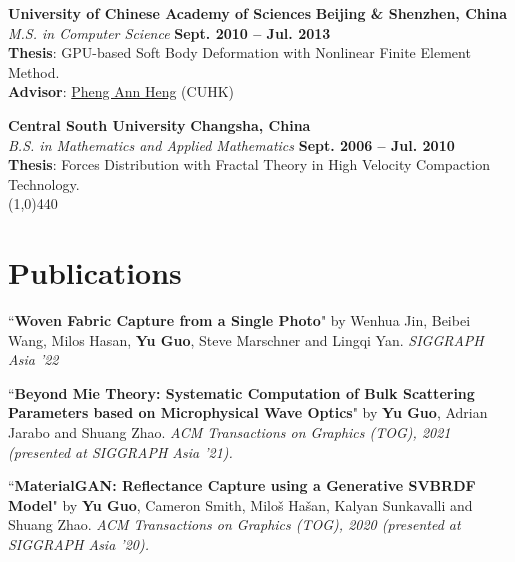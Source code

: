\documentclass[margin,line]{resume}
\begin{document}
\begin{resume}
    \textbf{University of Chinese Academy of Sciences}  \hfill \textbf{Beijing \& Shenzhen, China}\\
    \textsl{M.S. in Computer Science}                 \hfill \textbf{Sept. 2010 -- Jul. 2013} \\
	\textbf{Thesis}: GPU-based Soft Body Deformation with Nonlinear Finite Element Method. \\
	\textbf{Advisor}: \href{http://www.cse.cuhk.edu.hk/~pheng/}{Pheng Ann Heng} (CUHK)

    \textbf{Central South University}      \hfill \textbf{Changsha, China} \\
    \textsl{B.S. in Mathematics and Applied Mathematics}                \hfill \textbf{Sept. 2006 -- Jul. 2010}  \\
	\textbf{Thesis}: Forces Distribution with Fractal Theory in High Velocity Compaction Technology. \\
    
    \vspace{-5.0mm}
    \line(1,0){440}
    \vspace{-5.0mm}

    \section{\mysidestyle Publications}
    
    ``\textbf{Woven Fabric Capture from a Single Photo}" 
    by Wenhua Jin, Beibei Wang, Milos Hasan, \textbf{Yu Guo}, Steve Marschner and Lingqi Yan. 
    \textsl{SIGGRAPH Asia '22}\\
    
    \vspace{-5mm}

    ``\textbf{Beyond Mie Theory: Systematic Computation of Bulk Scattering Parameters based on Microphysical Wave Optics}" 
    by \textbf{Yu Guo}, Adrian Jarabo and Shuang Zhao. 
    \textsl{ACM Transactions on Graphics (TOG), 2021 (presented at SIGGRAPH Asia '21).}\\
    
    \vspace{-5mm}

    ``\textbf{MaterialGAN: Reflectance Capture using a Generative SVBRDF Model}" 
    by \textbf{Yu Guo}, Cameron Smith, Milo\v{s} Ha\v{s}an, Kalyan Sunkavalli and Shuang Zhao. 
    \textsl{ACM Transactions on Graphics (TOG), 2020 (presented at SIGGRAPH Asia '20).}\\
    

\end{resume}
\end{document}
